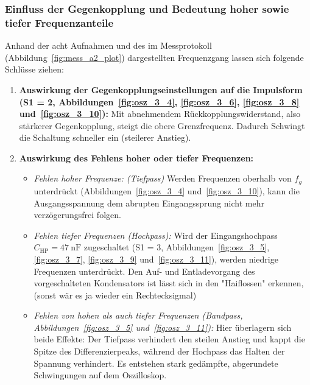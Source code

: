 \documentclass[12pt,a4paper,titlepage]{scrartcl}
\numberwithin{equation}{section}
\numberwithin{table}{section}
\numberwithin{figure}{section}
\begin{document}
\subsubsection{Einfluss der Gegenkopplung und Bedeutung hoher sowie tiefer Frequenzanteile}

Anhand der acht Aufnahmen und des im Messprotokoll (Abbildung~\ref{fig:mess_a2_plot}) dargestellten Frequenzgang lassen sich folgende Schlüsse ziehen:

\begin{enumerate}
    \item \textbf{Auswirkung der Gegenkopplungseinstellungen auf die Impulsform (S1 = 2, Abbildungen~\ref{fig:osz_3_4}, \ref{fig:osz_3_6}, \ref{fig:osz_3_8} und~\ref{fig:osz_3_10}):}
    Mit abnehmendem Rückkopplungswiderstand, also stärkerer Gegenkopplung, steigt die obere Grenzfrequenz. Dadurch Schwingt die Schaltung schneller ein (steilerer Anstieg). 
   
    \item \textbf{Auswirkung des Fehlens hoher oder tiefer Frequenzen:}
    \begin{itemize}
        \item \emph{Fehlen hoher Frequenze: (Tiefpass)} Werden Frequenzen oberhalb von $f_g$ unterdrückt (Abbildungen~\ref{fig:osz_3_4} und~\ref{fig:osz_3_10}), kann die Ausgangsspannung dem abrupten Eingangssprung nicht mehr verzögerungsfrei folgen.
    
        \item \emph{Fehlen tiefer Frequenzen (Hochpass):} Wird der Eingangshochpass $C_{\text{HP}} = \SI{47}{\nano\farad}$ zugeschaltet (S1 = 3, Abbildungen~\ref{fig:osz_3_5}, \ref{fig:osz_3_7}, \ref{fig:osz_3_9} und~\ref{fig:osz_3_11}), werden niedrige Frequenzen unterdrückt. Den Auf- und Entladevorgang des vorgeschalteten Kondensators ist lässt sich in den "Haiflossen" erkennen, (sonst wär es ja wieder ein Rechtecksigmal)
        \item \emph{Fehlen von hohen als auch tiefer Frequenzen (Bandpass, Abbildungen~\ref{fig:osz_3_5} und~\ref{fig:osz_3_11}):} Hier überlagern sich beide Effekte: Der Tiefpass verhindert den steilen Anstieg und kappt die Spitze des Differenzierpeaks, während der Hochpass das Halten der Spannung verhindert. Es entstehen stark gedämpfte, abgerundete Schwingungen auf dem Oszilloskop.
    \end{itemize}
\end{enumerate}

\end{document}
